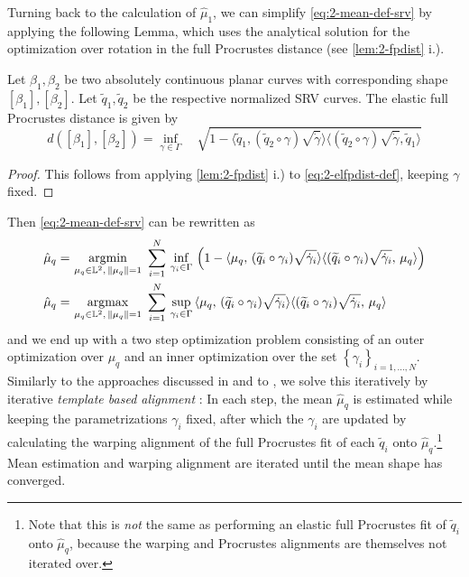 Turning back to the calculation of $\hat\mu_1$, we can simplify \cref{eq:2-mean-def-srv} by applying the following Lemma, which uses the analytical solution for the optimization over rotation in the full Procrustes distance (see \cref{lem:2-fpdist} i.). 

\begin{lemma}
  \label{lem:2-elfpdist}
  Let $\beta_1, \beta_2$ be two absolutely continuous planar curves with corresponding shape $[\beta_1], [\beta_2]$. Let $\widetilde q_1, \widetilde q_2$ be the respective normalized SRV curves.
  The elastic full Procrustes distance is given by
  \begin{equation}
    d([\beta_1],[\beta_2]) = \inf_{\gamma \in \Gamma} \quad \sqrt{ 1 - \langle \widetilde q_1, ( \widetilde q_2 \circ \gamma) \sqrt{\dot\gamma} \rangle \langle (\widetilde q_2 \circ \gamma) \sqrt{\dot\gamma}, \widetilde q_1 \rangle }
  \end{equation}
  \begin{proof}
    This follows from applying \cref{lem:2-fpdist} i.) to \cref{eq:2-elfpdist-def}, keeping $\gamma$ fixed.
  \end{proof}
\end{lemma}

\noindent Then \cref{eq:2-mean-def-srv} can be rewritten as
\begin{align}
  \hat\mu_q = &\, \operatorname*{argmin}_{\mu_q \in \mathbb{L}^2,\,\lVert\mu_q\rVert = 1}\,\,
    \sum_{i=1}^N \,\inf_{\gamma_i \in \Gamma}\, \left(1 - \langle \mu_q,\,(\widetilde q_i \circ \gamma_i) \sqrt{\dot\gamma_i} \rangle \langle (\widetilde q_i \circ \gamma_i) \sqrt{\dot\gamma_i},\, \mu_q\rangle \right) \\
  \hat\mu_q = &\, \operatorname*{argmax}_{\mu_q \in \mathbb{L}^2,\,\lVert\mu_q\rVert = 1}\,\,
    \sum_{i=1}^N \,\sup_{\gamma_i \in \Gamma}\, \langle \mu_q,\,(\widetilde q_i \circ \gamma_i) \sqrt{\dot\gamma_i} \rangle \langle (\widetilde q_i \circ \gamma_i) \sqrt{\dot\gamma_i},\, \mu_q\rangle\,
\end{align}
and we end up with a two step optimization problem consisting of an outer optimization over $\mu_q$ and an inner optimization over the set $\left\{\gamma_i\right\}_{i=1,\dots,N}$.
Similarly to the approaches discussed in \cite{SrivastavaKlassen2016} and to \cite{Steyer2021}, we solve this iteratively by iterative \emph{template based alignment} \parencite[see e.g.][271]{SrivastavaKlassen2016}:
In each step, the mean $\hat\mu_q$ is estimated while keeping the parametrizations $\gamma_i$ fixed, after which the $\gamma_i$ are updated by calculating the warping alignment of the full Procrustes fit of each $\widetilde q_i$ onto $\hat\mu_q$.\footnote{Note that this is \emph{not} the same as performing an elastic full Procrustes fit of $\widetilde q_i$ onto $\hat \mu_q$, because the warping and Procrustes alignments are themselves not iterated over.}
Mean estimation and warping alignment are iterated until the mean shape has converged.

